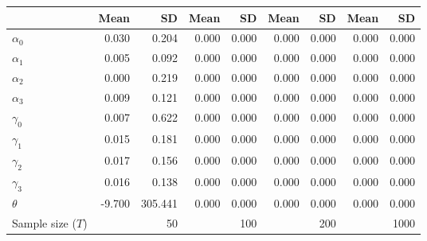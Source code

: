 
\begin{tabular}[t]{lrrrrrrrr}
\toprule
  & Mean & SD & Mean  & SD  & Mean   & SD   & Mean    & SD   \\
\midrule
$\alpha_{0}$ & 0.030 & 0.204 & 0.000 & 0.000 & 0.000 & 0.000 & 0.000 & 0.000\\
$\alpha_{1}$ & 0.005 & 0.092 & 0.000 & 0.000 & 0.000 & 0.000 & 0.000 & 0.000\\
$\alpha_{2}$ & 0.000 & 0.219 & 0.000 & 0.000 & 0.000 & 0.000 & 0.000 & 0.000\\
$\alpha_{3}$ & 0.009 & 0.121 & 0.000 & 0.000 & 0.000 & 0.000 & 0.000 & 0.000\\
$\gamma_{0}$ & 0.007 & 0.622 & 0.000 & 0.000 & 0.000 & 0.000 & 0.000 & 0.000\\
$\gamma_{1}$ & 0.015 & 0.181 & 0.000 & 0.000 & 0.000 & 0.000 & 0.000 & 0.000\\
$\gamma_{2}$ & 0.017 & 0.156 & 0.000 & 0.000 & 0.000 & 0.000 & 0.000 & 0.000\\
$\gamma_{3}$ & 0.016 & 0.138 & 0.000 & 0.000 & 0.000 & 0.000 & 0.000 & 0.000\\
$\theta$ & -9.700 & 305.441 & 0.000 & 0.000 & 0.000 & 0.000 & 0.000 & 0.000\\
Sample size ($T$) &  & 50 &  & 100 &  & 200 &  & 1000\\
\bottomrule
\end{tabular}
